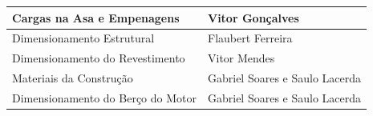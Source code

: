 \begin{xltabular}{\textwidth}{|X|X|}
Cargas na Asa e Empenagens
& Vitor Gonçalves \\
\hline

Dimensionamento Estrutural
& Flaubert Ferreira \\
\hline

Dimensionamento do Revestimento
& Vitor Mendes \\
\hline

Materiais da Construção 
& Gabriel Soares e Saulo Lacerda \\
\hline

Dimensionamento do Berço do Motor 
& Gabriel Soares e Saulo Lacerda \\
\hline

\end{xltabular}





